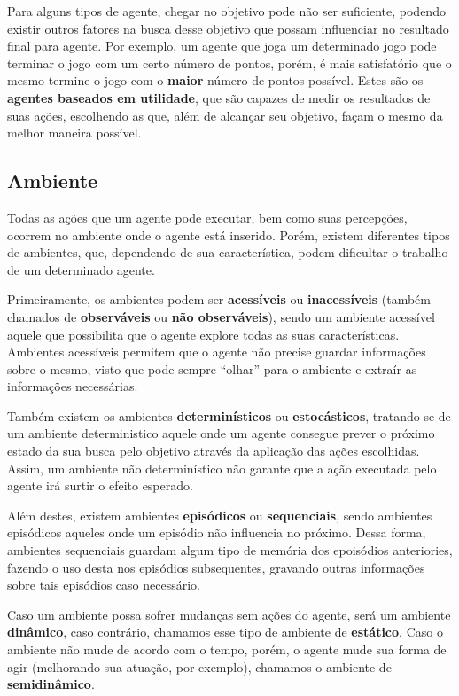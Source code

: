Para alguns tipos de agente, chegar no objetivo pode não ser suficiente,
podendo existir outros fatores na busca desse objetivo que possam influenciar
no resultado final para agente. Por exemplo, um agente que joga um determinado
jogo pode terminar o jogo com um certo número de pontos, porém, é mais
satisfatório que o mesmo termine o jogo com o \textbf{maior} número de pontos
possível. Estes são os \textbf{agentes baseados em utilidade}, que são capazes
de medir os resultados de suas ações, escolhendo as que, além de alcançar seu
objetivo, façam o mesmo da melhor maneira possível.

\subsection{Ambiente}
Todas as ações que um agente pode executar, bem como suas percepções, ocorrem no
ambiente onde o agente está inserido. Porém, existem diferentes tipos de
ambientes, que, dependendo de sua característica, podem dificultar o trabalho de
um determinado agente.

Primeiramente, os ambientes podem ser \textbf{acessíveis} ou
\textbf{inacessíveis} (também chamados de \textbf{observáveis} ou \textbf{não
observáveis}), sendo um ambiente acessível aquele que possibilita que o agente
explore todas as suas características. Ambientes acessíveis permitem que o
agente não precise guardar informações sobre o mesmo, visto que pode sempre
``olhar'' para o ambiente e extraír as informações necessárias.

Também existem os ambientes \textbf{determinísticos} ou \textbf{estocásticos},
tratando-se de um ambiente deterministico aquele onde um agente consegue prever
o próximo estado da sua busca pelo objetivo através da aplicação das ações
escolhidas. Assim, um ambiente não determinístico não garante que a ação
executada pelo agente irá surtir o efeito esperado.

Além destes, existem ambientes \textbf{episódicos} ou \textbf{sequenciais},
sendo ambientes episódicos aqueles onde um episódio não influencia no próximo.
Dessa forma, ambientes sequenciais guardam algum tipo de memória dos epoisódios
anteriories, fazendo o uso desta nos episódios subsequentes, gravando outras
informações sobre tais episódios caso necessário.

Caso um ambiente possa sofrer mudanças sem ações do agente, será um ambiente
\textbf{dinâmico}, caso contrário, chamamos esse tipo de ambiente de
\textbf{estático}. Caso o ambiente não mude de acordo com o tempo, porém, o
agente mude sua forma de agir (melhorando sua atuação, por exemplo), chamamos
o ambiente de \textbf{semidinâmico}.

